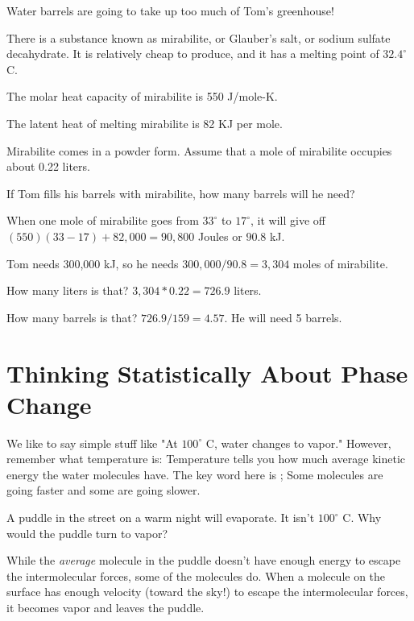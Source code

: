 \begin{Exercise}[title=Using Mirabilite For Thermal Energy Storage, label=mirabilite]

Water barrels are going to take up too much of Tom's greenhouse!

There is a substance known as mirabilite, or Glauber's salt,  or sodium sulfate decahydrate.  It is relatively cheap to produce, and it has a melting point of $32.4^\circ$ C.

The molar heat capacity of mirabilite is 550 J/mole-K.

The latent heat of melting mirabilite is 82 KJ per mole.

Mirabilite comes in a powder form.  Assume that a mole of mirabilite occupies about 0.22 liters.

If Tom fills his barrels with mirabilite,  how many barrels will he need?

\end{Exercise}
\begin{Answer}[ref=mirabilite] 

When one mole of mirabilite goes from $33^\circ$ to $17^\circ$,  it will give off $(550)(33-17) + 82,000 = 90,800$ Joules or $90.8$ kJ. 

Tom needs 300,000 kJ,  so he needs $300,000/90.8 =   3,304$ moles of mirabilite.

How many liters is that?  $3,304 * 0.22 = 726.9$ liters.

How many barrels is that? $726.9 / 159 = 4.57$.  He will need 5 barrels.
  
\end{Answer}

\section{Thinking Statistically About Phase Change}

We like to say simple stuff like "At $100^\circ$ C,  water changes to vapor." However,  remember what
temperature is: Temperature tells you how much average kinetic energy the water molecules have.   The key word here is ; Some molecules are going faster and some are going slower.

A puddle in the street on a warm night will evaporate.   It isn't  $100^\circ$ C.  Why would the puddle turn to vapor?

While the \emph{average} molecule in the puddle doesn't have enough energy to escape the intermolecular forces,  some of the molecules do.  When a molecule on the surface has enough velocity (toward the sky!) to escape the intermolecular forces,  it becomes vapor and leaves the puddle.

